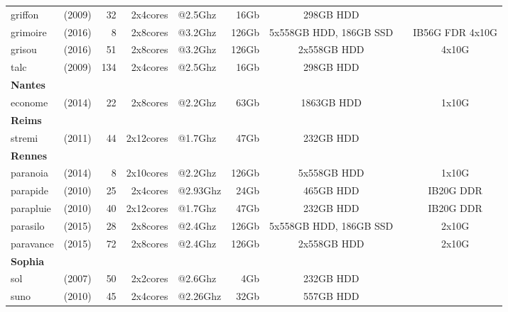 \begin{center}
\begin{tabular}{|lr|r|rl|r|c|c|c|}
griffon & (2009) & 32 & 2x4cores & @2.5Ghz & 16Gb &  298GB HDD &  &  \\
grimoire & (2016) & 8 & 2x8cores & @3.2Ghz & 126Gb &  5x558GB HDD, 186GB SSD &  & IB56G FDR 4x10G \\
grisou & (2016) & 51 & 2x8cores & @3.2Ghz & 126Gb &  2x558GB HDD &  &  4x10G \\
talc & (2009) & 134 & 2x4cores & @2.5Ghz & 16Gb &  298GB HDD &  &  \\
\textbf{Nantes} &  &  &  &  &  &  &  &  \\
econome & (2014) & 22 & 2x8cores & @2.2Ghz & 63Gb &  1863GB HDD &  &  1x10G \\
\textbf{Reims} &  &  &  &  &  &  &  &  \\
stremi & (2011) & 44 & 2x12cores & @1.7Ghz & 47Gb &  232GB HDD &  &  \\
\textbf{Rennes} &  &  &  &  &  &  &  &  \\
paranoia & (2014) & 8 & 2x10cores & @2.2Ghz & 126Gb &  5x558GB HDD &  &  1x10G \\
parapide & (2010) & 25 & 2x4cores & @2.93Ghz & 24Gb &  465GB HDD &  & IB20G DDR \\
parapluie & (2010) & 40 & 2x12cores & @1.7Ghz & 47Gb &  232GB HDD &  & IB20G DDR \\
parasilo & (2015) & 28 & 2x8cores & @2.4Ghz & 126Gb &  5x558GB HDD, 186GB SSD &  &  2x10G \\
paravance & (2015) & 72 & 2x8cores & @2.4Ghz & 126Gb &  2x558GB HDD &  &  2x10G \\
\textbf{Sophia} &  &  &  &  &  &  &  &  \\
sol & (2007) & 50 & 2x2cores & @2.6Ghz & 4Gb &  232GB HDD &  &  \\
suno & (2010) & 45 & 2x4cores & @2.26Ghz & 32Gb &  557GB HDD &  &  \\

\hline 
\end{tabular} 
\end{center}